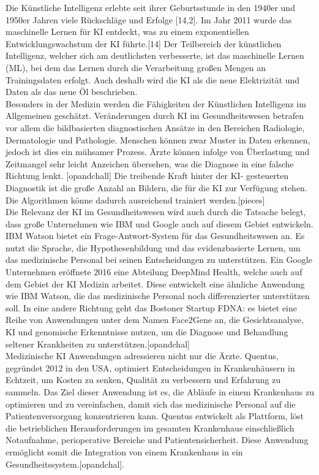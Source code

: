 Die Künstliche Intelligenz erlebte seit ihrer Geburtsstunde in den 1940er und 1950er Jahren viele Rückschläge und Erfolge [14,2]. Im Jahr 2011 wurde das maschinelle Lernen für KI entdeckt, was zu einem exponentiellen Entwicklungswachstum der KI führte.[14] Der Teilbereich der künstlichen Intelligenz, welcher sich am deutlichsten verbesserte, ist das maschinelle Lernen (ML), bei dem das Lernen durch die Verarbeitung großen Mengen an Trainingsdaten erfolgt. Auch deshalb wird die KI als die neue Elektrizität und Daten als das neue Öl beschrieben.\label{sec:Chapter_14}\\

Besonders in der Medizin werden die Fähigkeiten der Künstlichen Intelligenz im Allgemeinen geschätzt. Veränderungen durch KI im Gesundheitswesen betrafen vor allem die bildbasierten diagnostischen Ansätze in den Bereichen Radiologie, Dermatologie und Pathologie. Menschen können zwar Muster in Daten erkennen, jedoch ist dies ein mühsamer Prozess. Ärzte können infolge von Überlastung und Zeitmangel sehr leicht Anzeichen übersehen, was die Diagnose in eine falsche Richtung lenkt. [opandchall] Die treibende Kraft hinter der KI- gesteuerten Diagnostik ist die große Anzahl an Bildern, die für die KI zur Verfügung stehen. Die Algorithmen könne dadurch ausreichend trainiert werden.[pieces] \\

Die Relevanz der KI im Gesundheitswesen wird auch durch die Tatsache belegt, dass große Unternehmen wie IBM und Google auch auf diesem Gebiet entwickeln. IBM Watson bietet ein Frage-Antwort-System für das Gesundheitswesen an. Es nutzt die Sprache, die Hypothesenbildung und das evidenzbasierte Lernen, um das medizinische Personal bei seinen Entscheidungen zu unterstützen. Ein Google Unternehmen eröffnete 2016 eine Abteilung DeepMind Health, welche auch auf dem Gebiet der KI Medizin arbeitet. Diese entwickelt eine ähnliche Anwendung wie IBM Watson, die das medizinische Personal noch differenzierter unterstützen soll. In eine andere Richtung geht das Bostoner Startup FDNA: es bietet eine Reihe von Anwendungen unter dem Namen Face2Gene an, die Gesichtsanalyse, KI und genomische Erkenntnisse nutzen, um die Diagnose und Behandlung seltener Krankheiten zu unterstützen.[opandchal]\\

Medizinische KI Anwendungen adressieren nicht nur die Ärzte. Quentus, gegründet 2012 in den USA, optimiert Entscheidungen in Krankenhäusern in Echtzeit, um Kosten zu senken, Qualität zu verbessern und Erfahrung zu sammeln. Das Ziel dieser Anwendung ist es, die Abläufe in einem Krankenhaus zu optimieren und zu vereinfachen, damit sich das medizinische Personal auf die Patientenversorgung konzentrieren kann. Quentus entwickelt als Plattform, löst die betrieblichen Herausforderungen im gesamten Krankenhaus einschließlich Notaufnahme, perioperative Bereiche und Patientensicherheit. Diese Anwendung ermöglicht somit die Integration von einem Krankenhaus in ein Gesundheitssystem.[opandchal].\\
 
